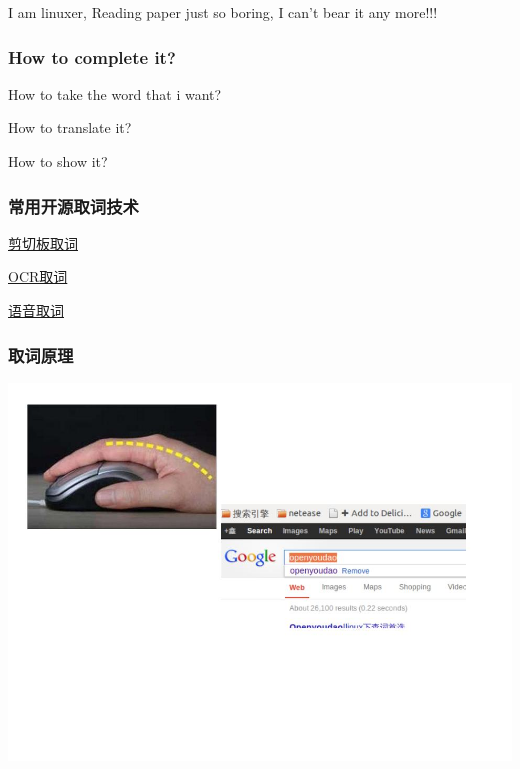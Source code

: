 \documentclass[10pt]{beamer}
\begin{document}
\begin{CJK*}{UTF8}{song}
\begin{frame}
I am linuxer, Reading paper just so boring, I can't bear it any more!!!
\end{frame}
\begin{frame}
  \frametitle{\Large{How to complete it?}}
\begin{itemize}
 \LARGE{\item How to take the word that i want?
  \item How to translate it?
  \item How to show it?}
\end{itemize}
\end{frame}
\begin{frame}
  \frametitle{\Large{常用开源取词技术}}
\LARGE\begin{itemize}
 {\item \href{http://nullege.com/codes/show/src@p@y@python-xlib-HEAD@trunk@examples@record_demo.py/86/Xlib.display.Display.record_create_context}{剪切板取词}
  \item \href{https://code.google.com/p/tesseract-ocr/}{OCR取词}
  \item \href{http://www.athoughtabroad.com/2013/05/22/using-google-s-speech-recognition-web-service-with-python}{语音取词}}
\end{itemize}
\end{frame}
\begin{frame}
  \frametitle{取词原理}
\begin{center} 
  \includegraphics[width=1.1\textwidth]{shijian.jpg}
\end{center}
\end{frame}


\end{CJK*}
\end{document}
